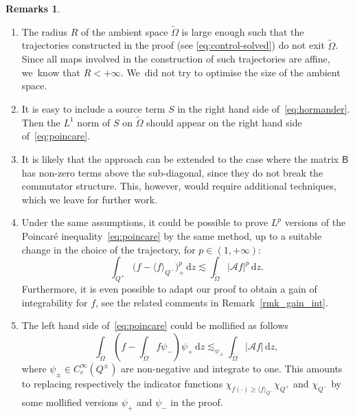 \documentclass[JEP,XML,SOM,Unicode,NoFloatCountersInSection,published]{cedram}
\theoremstyle{definition}
\newtheorem{remarks}[theorem]{Remarks}
\newcommand{\cA}{{\mathcal A}}
\newcommand{\sB}{{\mathsf B}}
\newcommand{\dd}{{\, \mathrm d}}
\begin{document}
\skpt
\begin{remarks}
\begin{enumerate}
\item The radius $R$ of the ambient space $\tilde \Omega$ is large enough
such that the trajectories constructed in the proof (see
\eqref{eq:control-solved}) do not exit $\tilde \Omega$. Since all maps
involved in the construction of such trajectories are affine, we~know that $R < +\infty$. We~did not try to optimise the size of the ambient space.

\item It is easy to include a source term $S$ in the right hand
side of~\eqref{eq:hormander}. Then the $L^1$ norm of $S$ on
$\tilde \Omega$ should appear on the right hand side
of~\eqref{eq:poincare}.

\item It is likely that the approach can be extended to the
case where the matrix $\sB$ has non-zero terms above the
sub-diagonal, since they do not break the commutator
structure. This, however, would require additional techniques,
which we leave for further work.

\item Under the same assumptions, it could be possible to
prove $L^p$ versions of the Poincaré
inequality~\eqref{eq:poincare} by the same method, up to a suitable change in the choice of the trajectory, for
$p \in (1, + \infty)$:
\begin{equation*}
\int_{Q^+} \big(f - \langle
f\rangle_{Q^-}\big)_+^p \dd z \lesssim
\int_{\tilde \Omega} \big\vert \cA f\big\vert^p \dd z.
\end{equation*}
Furthermore, it is even possible to adapt our proof to
obtain a gain of integrability for $f$, see the
related comments in Remark~\ref{rmk_gain_int}.

\item The left hand side of~\eqref{eq:poincare} could be
mollified as follows\vspace*{-3pt}\enlargethispage{.5\baselineskip}
\begin{equation}
\label{eq:moll-Poincare}
\int_{\tilde \Omega} \left(f - \int_{\tilde \Omega} f \psi_- \right) \psi_+
\dd z \lesssim_{\psi_\pm} \int_{\tilde \Omega} \big\vert \cA
f\big\vert\dd z,
\end{equation}
where $\psi_\pm \in C^\infty_c(Q^\pm)$ are non-negative and
integrate to one. This amounts to replacing respectively the
indicator functions
$\chi_{f(\cdot)\geq \langle f \rangle_{Q^-}} \chi_{Q^+}$ and
$\chi_{Q^-}$ by some mollified versions $\psi_+$ and $\psi_-$
in the proof.


\end{enumerate}
\end{remarks}
\end{document}
